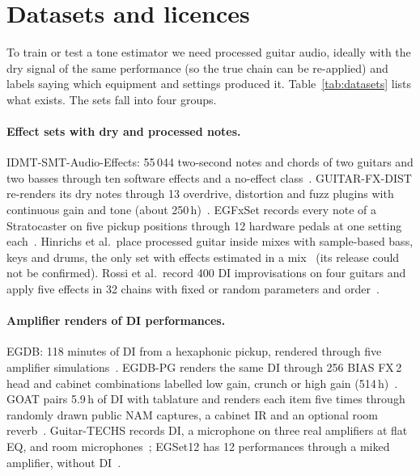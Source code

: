\section{Datasets and licences}
\label{sec:datasets}

To train or test a tone estimator we need processed guitar audio, ideally with
the dry signal of the same performance (so the true chain can be re-applied) and
labels saying which equipment and settings produced it. Table~\ref{tab:datasets}
lists what exists. The sets fall into four groups.

\paragraph{Effect sets with dry and processed notes.} IDMT-SMT-Audio-Effects:
55\,044 two-second notes and chords of two guitars and two basses through ten
software effects and a no-effect class~\cite{stein2010aes}. GUITAR-FX-DIST
re-renders its dry notes through 13 overdrive, distortion and fuzz plugins with
continuous gain and tone (about 250\,h)~\cite{comunita2021guitar}. EGFxSet
records every note of a Stratocaster on five pickup positions through 12
hardware pedals at one setting each~\cite{pedroza2022egfxset}. Hinrichs et al.\
place processed guitar inside mixes with sample-based bass, keys and drums, the
only set with effects estimated in a mix~\cite{hinrichs2022convolutional} (its
release could not be confirmed). Rossi et al.\ record 400 DI improvisations on
four guitars and apply five effects in 32 chains with fixed or random parameters
and order~\cite{rossi2025automatic}.

\paragraph{Amplifier renders of DI performances.} EGDB: 118 minutes of DI from a
hexaphonic pickup, rendered through five amplifier simulations~\cite{chen2022egdb}.
EGDB-PG renders the same DI through 256 BIAS FX\,2 head and cabinet combinations
labelled low gain, crunch or high gain (514\,h)~\cite{chen2026toward}. GOAT
pairs 5.9\,h of DI with tablature and renders each item five times through
randomly drawn public NAM captures, a cabinet IR and an optional room
reverb~\cite{loth2025goat}. Guitar-TECHS records DI, a microphone on three real
amplifiers at flat EQ, and room microphones~\cite{pedroza2025guitartechs};
EGSet12 has 12 performances through a miked amplifier, without
DI~\cite{pedroza2024egset12}.

